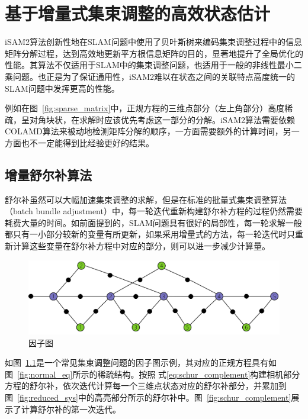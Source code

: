 \chapter{基于增量式集束调整的高效状态估计}\label{ch:ba}

iSAM2算法\cite{kaess2008isam,kaess2012isam2}创新性地在SLAM问题中使用了贝叶斯树来编码集束调整过程中的信息矩阵分解过程，达到高效地更新平方根信息矩阵的目的，显著地提升了全局优化的性能。其算法不仅适用于SLAM中的集束调整问题，也适用于一般的非线性最小二乘问题。也正是为了保证通用性，iSAM2难以在状态之间的关联特点高度统一的SLAM问题中发挥更高的性能。

例如在图~\ref{fig:sparse_matrix}中，正规方程的三维点部分（左上角部分）高度稀疏，呈对角块状，在求解时应该优先考虑这一部分的分解。iSAM2算法需要依赖COLAMD\citep{davis2004algorithm}算法来被动地检测矩阵分解的顺序，一方面需要额外的计算时间，另一方面也不一定能得到比经验更好的结果。

\section{增量舒尔补算法}

舒尔补虽然可以大幅加速集束调整的求解，但是在标准的批量式集束调整算法（batch bundle adjustment）中，每一轮迭代重新构建舒尔补方程的过程仍然需要耗费大量的时间。如前面提到的，SLAM问题具有很好的局部性，每一轮求解一般都只有一小部分较新的变量有所更新，如果采用增量式的方法，每一轮迭代时只重新计算这些变量在舒尔补方程中对应的部分，则可以进一步减少计算量。

\begin{figure}[htb!]
    \centering
    \includegraphics[scale=.7]{Pictures/factor_graph.png}
    \caption{因子图}
    \label{fig:factor_graph}
\end{figure}

如图~\ref{fig:factor_graph}是一个常见集束调整问题的因子图示例，其对应的正规方程具有如图~\ref{fig:normal_eq}所示的稀疏结构。按照 式\eqref{eq:schur_complement}构建相机部分方程的舒尔补，依次迭代计算每一个三维点状态对应的舒尔补部分，并累加到图~\ref{fig:reduced_sys}中的高亮部分所示的舒尔补中。图~\ref{fig:schur_complement}展示了计算舒尔补的第一次迭代。

